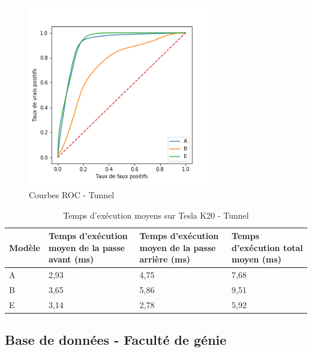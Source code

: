     \begin{figure}[H]
        \centering
        \includegraphics[width=8cm]{images/tunnel_roc.png}
        \caption{Courbes ROC - Tunnel}
        \label{fig:tunnel_roc}
    \end{figure}

    \begin{table}[H]
        \centering
        \caption{Temps d'exécution moyens sur Tesla K20 - Tunnel}
        \label{tab:resultat_tunnel_temps_execution}
        \begin{tabular}{lp{4cm}p{4cm}p{4cm}}
            \midrule
            Modèle & Temps d'exécution moyen de la passe avant (ms) & Temps d'exécution moyen de la passe arrière (ms) & Temps d'exécution total moyen (ms)\\
            \midrule\midrule
            A & 2,93 & 4,75 & 7,68\\
            B & 3,65 & 5,86 & 9,51\\
            E & 3,14 & 2,78 & 5,92\\
            \midrule
        \end{tabular}
    \end{table}

\subsection{Base de données - Faculté de génie}

